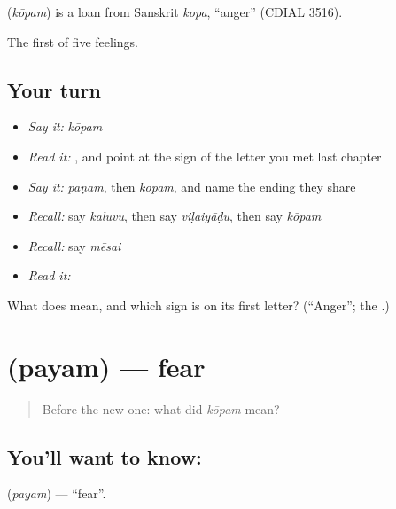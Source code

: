 \begin{cousinweb}
\textbf{} (\emph{kōpam}) is a loan from Sanskrit \emph{kopa}, \textquotedblleft{}anger\textquotedblright{} (CDIAL 3516).
\end{cousinweb}

\begin{grammarlens}[title={What you've built}]
The first of five feelings.
\end{grammarlens}

\subsection*{Your turn}
\begin{itemize}
\raggedright
  \item \emph{Say it:} \emph{kōpam}
  \item \emph{Read it:} \textbf{}, and point at the sign of the letter you met last chapter
  \item \emph{Say it:} \emph{paṇam}, then \emph{kōpam}, and name the ending they share
  \item \emph{Recall:} say \emph{kaḻuvu}, then say \emph{viḷaiyāḍu}, then say \emph{kōpam}
  \item \emph{Recall:} say \emph{mēsai}
  \item \emph{Read it:} \textbf{}
\end{itemize}

\begin{tcolorbox}[breakable,colback=teal!4,colframe=teal!35!black,title={Before you move on}]
What does  mean, and which sign is on its first letter? (\textquotedblleft{}Anger\textquotedblright{}; the \textbf{}.)
\end{tcolorbox}
\section[\texorpdfstring{\ta{பயம்} (payam)}{பயம் (payam)}]{ (payam) — fear}

\label{lesson:TA-C72-fear}



\begin{quote}
Before the new one: what did \emph{kōpam} mean?
\end{quote}

\subsection*{You'll want to know: }
\textbf{} (\emph{payam}) — \textquotedblleft{}fear\textquotedblright{}.

